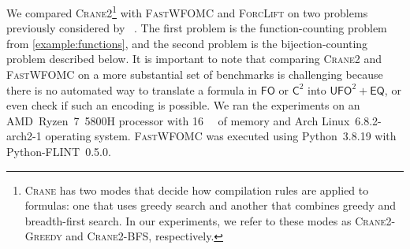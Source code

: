 \documentclass[letterpaper]{article} %
\theoremstyle{remark}
\theoremstyle{definition}
\newcommand{\Ctwo}{$\mathsf{C}^{2}$}
\newcommand{\FO}{$\mathsf{FO}$}
\newcommand{\UFO}{$\mathsf{UFO}^{2} + \mathsf{EQ}$}
\newcommand{\Cranetwo}{\textsc{Crane2}}
\newcommand{\Cranebfs}{\textsc{Crane2-BFS}}
\newcommand{\Cranegreedy}{\textsc{Crane2-Greedy}}
\begin{document}







We compared \Cranetwo{}\footnote{\textsc{Crane} has two modes that decide how
  compilation rules are applied to formulas: one that uses greedy search and
  another that combines greedy and breadth-first search. In our experiments, we
  refer to these modes as \Cranegreedy{} and \Cranebfs{}, respectively.} with
\textsc{FastWFOMC} and \textsc{ForcLift} on two problems previously considered
by \citeauthor{DBLP:conf/kr/DilkasB23}~. The
first problem is the function-counting problem from \cref{example:functions},
and the second problem is the bijection-counting problem described below. It is
important to note that comparing \Cranetwo{} and \textsc{FastWFOMC} on a more
substantial set of benchmarks is challenging because there is no automated way
to translate a formula in \FO{} or \Ctwo{} into \UFO{}, or even check if such an
encoding is possible. We ran the experiments on an AMD~Ryzen~7~5800H processor
with \SI{16}{\gibi\byte} of memory and Arch Linux~6.8.2-arch2-1 operating
system. \textsc{FastWFOMC} was executed using Python~3.8.19 with
Python-FLINT~0.5.0.
\end{document}
